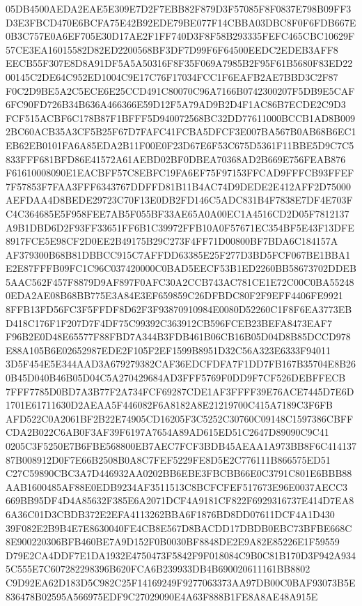 \documentclass[UTF8,fontset=fandol,zihao=-4,a4paper]{ctexart}
\begin{document}
{{05DB4500AEDA2EAE5E309E7D2F7EBB82F879D3F57085F8F0837E798B09FF3D3E3FBCD470E6BCFA75E42B92EDE79BE077F14CBBA03DBC8F0F6FDB667E
0B3C757E0A6EF705E30D17AE2F1FF740D3F8F58B293335FEFC465CBC10629F57CE3EA16015582D82ED2200568BF3DF7D99F6F64500EEDC2EDEB3AFF8
EECB55F307E8D8A91DF5A5A50316F8F35F069A7985B2F95F61B5680F83ED2200145C2DE64C952ED1004C9E17C76F17034FCC1F6EAFB2AE7BBD3C2F87
F0C2D9BE5A2C5ECE6E25CCD491C80070C96A7166B0742300207F5DB9E5CAF6FC90FD726B34B636A466366E59D12F5A79AD9B2D4F1AC86B7ECDE2C9D3
FCF515ACBF6C178B87F1BFFF5D940072568BC32DD77611000BCCB1AD8B0092BC60ACB35A3CF5B25F67D7FAFC41FCBA5DFCF3E007BA567B0AB68B6EC1
EB62EB0101FA6A85EDA2B11F00E0F23D67E6F53C675D5361F11BBE5D9C7C5833FFF681BFD86E41572A61AEBD02BF0DBEA70368AD2B669E756FEAB876
F61610008090E1EACBFF57C8EBFC19FA6EF75F97153FFCAD9FFFCB93FFEF7F57853F7FAA3FFF6343767DDFFD81B11B4AC74D9DEDE2E412AFF2D75000
AEFDAA4D8BEDE29723C70F13E0DB2FD146C5ADC831B4F7838E7DF4E703FC4C364685E5F958FEE7AB5F055BF33AE65A0A00EC1A4516CD2D05F7812137
A9B1DBD6D2F93FF33651FF6B1C39972FFB10A0F57671EC354BF5E43F13DFE8917FCE5E98CF2D0EE2B49175B29C273F4FF71D00800BF7BDA6C184157A
AF379300B68B81DBBCC915C7AFFDD63385E25F277D3BD5FCF067BE1BBA1E2E87FFFB09FC1C96C037420000C0BAD5EECF53B1ED2260BB58673702DDEB
5AAC562F457F8879D9AF897F0AFC30A2CCB743AC781CE1E72C00C0BA552480EDA2AE08B68BB775E3A84E3EF659859C26DFBDC80F2F9EFF4406FE9921
8FFB13FD56FC3F5FFDF8D62F3F93870910984E0080D52260C1F8F6EA3773EBD418C176F1F207D7F4DF75C99392C363912CB596FCEB23BEFA8473EAF7
F96B2E0D48E65577F88FBD7A344B3FDB461B06CB16B05D04D8B85DCCD978E88A105B6E02652987EDE2F105F2EF1599B8951D32C56A323E6333F94011
3D5F454E5E344AAD3A679279382CAF36EDCFDFA7F1DD7FB167B35704E8B260B45D040B46B05D04C5A270429684AD3FFF5769F0DD9F7CF526DEBFFECB
7FFF7785D0BD7A3B77F2A734FCF69287CDE1AF3FFFF39E76ACE7445D7E6D1701E61711630D2AEAA5F446082F6A8182A8E21219700C415A7189C3F6FB
AFD522C0A2061BF2B22E74905CD16205F3C5252C30760C09148C1597386CBFFCDA2B022C6AB0F3AF39F6197A7654A89AD615ED51C2647D89090C9C41
0205C3F5250E7B6FBE568800EB7AEC7FCF3BDB45AEAA1A973BB8F6C41413787B008912D0F7E66B2508B0A8C7FEF5229FE8D5E2C776111B866575ED51
C27C59890CBC3A7D446932AA0202BB6EBE3FBCBB66E0C3791C801E6BBB88AAB1600485AF88E0EDB9234AF3511513C8BCFCFEF517673E96E0037AECC3
669BB95DF4D4A85632F385E6A2071DCF4A9181CF822F6929316737E414D7EA86A36C01D3CBDB372E2EFA4113262BBA6F1876BD8DD07611DCF4A1D430
39F082E2B9B4E7E8630040FE4CB8E567D8BACDD17DBDB0EBC73BFBE668C8E900220306BFB460BE7A9D152F0B0030BF8848DE2E9A82E85226E1F59559
D79E2CA4DDF7E1DA1932E4750473F5842F9F018084C9B0C81B170D3F942A9345C555E7C607282298396B620FCA6B239933DB4B690020611161BB8802
C9D92EA62D183D5C982C25F14169249F9277063373AA97DB00C0BAF93073B5E836478B02595A566975EDF9C27029090E4A63F888B1FE8A8AE48A915E
}}
\end{document}
